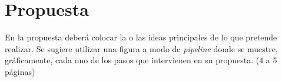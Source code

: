 \chapter{Propuesta}

En la propuesta deberá colocar la o las ideas principales de lo que pretende realizar. Se sugiere  utilizar una figura a modo de \textit{pipeline} donde se muestre,  gráficamente, cada uno de los pasos que intervienen en su propuesta.  (4 a 5 páginas)


